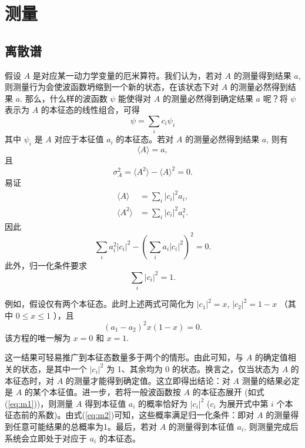 \section{测量}
\subsection{离散谱}
假设 $ A $ 是对应某一动力学变量的厄米算符。我们认为，若对 $ A $ 的测量得到结果 $ a $, 则测量行为会使波函数坍缩到一个新的状态，在该状态下对 $ A $ 的测量必然得到结果 $ a $. 那么，什么样的波函数 $ \psi $ 能使得对 $ A $ 的测量必然得到确定结果 $ a $ 呢？将 $ \psi $ 表示为 $ A $ 的本征态的线性组合，可得
\begin{equation}
	\psi = \sum_{i} c_{i} \psi_{i} \label{eq:m1}
\end{equation}
其中 $ \psi_{i} $ 是 $ A $ 对应于本征值 $ a_{i} $ 的本征态。若对 $ A $ 的测量必然得到结果 $ a $, 则有
\begin{equation}
	\langle A \rangle = a,
\end{equation}
且
\begin{equation}
	\sigma_A^2 = \langle A^2 \rangle - \langle A \rangle^2 = 0. 
\end{equation}
易证
\begin{align}
	\langle A \rangle &= \sum_{i} |c_{i}|^{2} a_{i}, \\
	\langle A^{2} \rangle &= \sum_{i} |c_{i}|^{2} a_{i}^{2}.
\end{align}
因此
\begin{equation}
	\sum_{i} a_{i}^{2} |c_{i}|^{2} - \left( \sum_{i} a_{i} |c_{i}|^{2} \right)^{2} = 0. 
\end{equation}
此外，归一化条件要求
\begin{equation}
	\sum_{i} |c_{i}|^{2} = 1. \label{eq:m2}
\end{equation}

例如，假设仅有两个本征态。此时上述两式可简化为 $ |c_{1}|^{2} = x $,  $ |c_{2}|^{2} = 1 - x $ （其中 $ 0 \leq x \leq 1 $ ），且
\begin{equation}
	(a_{1} - a_{2})^{2} x (1 - x) = 0.
\end{equation}
该方程的唯一解为 $ x = 0 $ 和 $ x = 1 $.  

这一结果可轻易推广到本征态数量多于两个的情形。由此可知，与 $ A $ 的确定值相关的状态，是其中一个 $ |c_{i}|^{2} $ 为 1、其余均为 0 的状态。换言之，仅当状态为 $ A $ 的本征态时，对 $ A $ 的测量才能得到确定值。这立即得出结论：对 $ A $ 测量的结果必定是 $ A $ 的某个本征值。进一步，若将一般波函数按 $ A $ 的本征态展开 (如式(\ref{eq:m1}))，则测量 $ A $ 得到本征值 $ a_{i} $ 的概率恰好为 $ |c_{i}|^{2} $  ($ c_{i} $ 为展开式中第 $ i $ 个本征态前的系数)。由式(\ref{eq:m2})可知，这些概率满足归一化条件：即对 $ A $ 的测量得到任意可能结果的总概率为1。最后，若对 $ A $ 的测量得到本征值 $ a_{i} $, 则测量完成后系统会立即处于对应于 $ a_{i} $ 的本征态。

